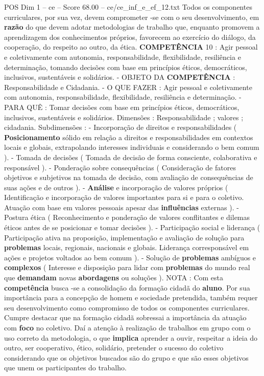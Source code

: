 \begin{textsample}{POS Dim 1 – ce – Score 68.00 – ce/ce\_inf\_e\_ef\_12.txt}
Todos os componentes curriculares, por sua vez, devem comprometer -se com o seu desenvolvimento, em \textbf{razão} do que devem adotar metodologias de trabalho que, enquanto promovem a aprendizagem dos conhecimentos próprios, favorecem ao exercício do diálogo, da cooperação, do respeito ao outro, da ética. \textbf{COMPETÊNCIA} 10 : Agir pessoal e coletivamente com autonomia, responsabilidade, flexibilidade, resiliência e determinação, tomando decisões com base em princípios éticos, democráticos, inclusivos, sustentáveis e solidários. - OBJETO DA \textbf{COMPETÊNCIA} : Responsabilidade e Cidadania. - O QUE FAZER : Agir pessoal e coletivamente com autonomia, responsabilidade, flexibilidade, resiliência e determinação. - PARA QUÊ : Tomar decisões com base em princípios éticos, democráticos, inclusivos, sustentáveis e solidários.
Dimensões : Responsabilidade ; valores ; cidadania.
Subdimensões : - Incorporação de direitos e responsabilidades ( \textbf{Posicionamento} sólido em relação a direitos e responsabilidades em contextos locais e globais, extrapolando interesses individuais e considerando o bem comum ). - Tomada de decisões ( Tomada de decisão de forma consciente, colaborativa e responsável ). - Ponderação sobre consequências ( Consideração de fatores objetivos e subjetivos na tomada de decisão, com avaliação de consequências de suas ações e de outros ). - \textbf{Análise} e incorporação de valores próprios ( Identificação e incorporação de valores importantes para si e para o coletivo.
Atuação com base em valores pessoais apesar das \textbf{influências} externas ). - Postura ética ( Reconhecimento e ponderação de valores conflitantes e dilemas éticos antes de se posicionar e tomar decisões ). - Participação social e liderança ( Participação ativa na proposição, implementação e avaliação de solução para \textbf{problemas} locais, regionais, nacionais e globais.
Liderança corresponsável em ações e projetos voltados ao bem comum ). - Solução de \textbf{problemas} ambíguos e \textbf{complexos} ( Interesse e disposição para lidar com \textbf{problemas} do mundo real que \textbf{demandam} novas \textbf{abordagens} ou soluções ).
NOTA : Com esta \textbf{competência} busca -se a consolidação da formação cidadã do \textbf{aluno}.
Por sua importância para a concepção de homem e sociedade pretendida, também requer seu desenvolvimento como compromisso de todos os componentes curriculares.
Cumpre destacar que na formação cidadã sobressai a importância da atuação com \textbf{foco} no coletivo.
Daí a atenção à realização de trabalhos em grupo com o uso correto da metodologia, o que \textbf{implica} aprender a ouvir, respeitar a ideia do outro, ser cooperativo, ético, solidário, pretender o sucesso do coletivo considerando que os objetivos buscados são do grupo e que são esses objetivos que unem os participantes do trabalho.

\end{textsample}
